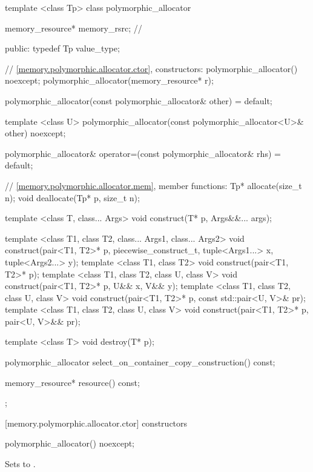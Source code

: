 %
\begin{codeblock}
template <class Tp>
class polymorphic_allocator {
  memory_resource* memory_rsrc; // \expos

public:
  typedef Tp value_type;

  // \ref{memory.polymorphic.allocator.ctor}, constructors:
  polymorphic_allocator() noexcept;
  polymorphic_allocator(memory_resource* r);

  polymorphic_allocator(const polymorphic_allocator& other) = default;

  template <class U>
    polymorphic_allocator(const polymorphic_allocator<U>& other) noexcept;

  polymorphic_allocator&
    operator=(const polymorphic_allocator& rhs) = default;

  // \ref{memory.polymorphic.allocator.mem}, member functions:
  Tp* allocate(size_t n);
  void deallocate(Tp* p, size_t n);

  template <class T, class... Args>
  void construct(T* p, Args&&... args);

  template <class T1, class T2, class... Args1, class... Args2>
    void construct(pair<T1, T2>* p, piecewise_construct_t,
                   tuple<Args1...> x, tuple<Args2...> y);
  template <class T1, class T2>
    void construct(pair<T1, T2>* p);
  template <class T1, class T2, class U, class V>
    void construct(pair<T1, T2>* p, U&& x, V&& y);
  template <class T1, class T2, class U, class V>
    void construct(pair<T1, T2>* p, const std::pair<U, V>& pr);
  template <class T1, class T2, class U, class V>
    void construct(pair<T1, T2>* p, pair<U, V>&& pr);

  template <class T>
    void destroy(T* p);

  polymorphic_allocator select_on_container_copy_construction() const;

  memory_resource* resource() const;
};
\end{codeblock}


[memory.polymorphic.allocator.ctor]{ constructors}

%
\begin{itemdecl}
polymorphic_allocator() noexcept;
\end{itemdecl}

\begin{itemdescr}
\pnum
\effects
Sets  to .
\end{itemdescr}

